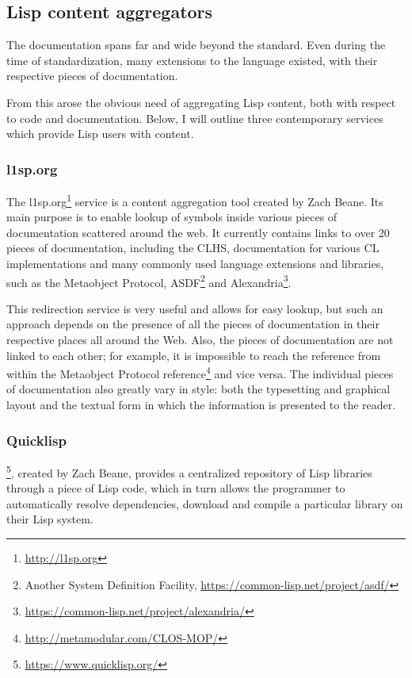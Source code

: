 \subsection{Lisp content aggregators}

The \cl{} documentation spans far and wide beyond the \cl{} standard. Even during the time of \cl{} standardization, many extensions to the language existed, with their respective pieces of documentation.

From this arose the obvious need of aggregating Lisp content, both with respect to code and documentation. Below, I will outline three contemporary services which provide Lisp users with content.

\subsubsection{l1sp.org}

The l1sp.org\footnote{\url{http://l1sp.org}} service is a content aggregation tool created by Zach Beane. Its main purpose is to enable lookup of symbols inside various pieces of documentation scattered around the web. It currently contains links to over 20 pieces of documentation, including the CLHS, documentation for various CL implementations and many commonly used language extensions and libraries, such as the Metaobject Protocol, ASDF\footnote{Another System Definition Facility, \url{https://common-lisp.net/project/asdf/}} and Alexandria\footnote{\url{https://common-lisp.net/project/alexandria/}}.

This redirection service is very useful and allows for easy lookup, but such an approach depends on the presence of all the pieces of documentation in their respective places all around the Web. Also, the pieces of documentation are not linked to each other; for example, it is impossible to reach the \cl{} reference from within the Metaobject Protocol reference\footnote{\url{http://metamodular.com/CLOS-MOP/}} and vice versa. The individual pieces of documentation also greatly vary in style: both the typesetting and graphical layout and the textual form in which the information is presented to the reader.

\subsubsection{Quicklisp}

\ql{}\footnote{\url{https://www.quicklisp.org/}}, created by Zach Beane, provides a centralized repository of Lisp libraries through a piece of Lisp code, which in turn allows the programmer to automatically resolve dependencies, download and compile a particular library on their Lisp system.

